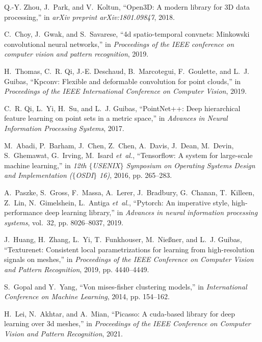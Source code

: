 \begin{thebibliography}{1}
Q.-Y. Zhou, J.~Park, and V.~Koltun, ``{Open3D: A modern library for 3D data
  processing},'' in \emph{arXiv preprint arXiv:1801.09847}, 2018.

C.~Choy, J.~Gwak, and S.~Savarese, ``4d spatio-temporal convnets: Minkowski
  convolutional neural networks,'' in \emph{Proceedings of the IEEE conference on
  computer vision and pattern recognition}, 2019.

H.~Thomas, C.~R. Qi, J.-E. Deschaud, B.~Marcotegui, F.~Goulette, and L.~J.
  Guibas, ``Kpconv: Flexible and deformable convolution for point clouds,'' in 
  \emph{Proceedings of the IEEE International Conference on Computer Vision},
  2019.

C.~R. Qi, L.~Yi, H.~Su, and L.~J. Guibas, ``{PointNet++}: Deep hierarchical
  feature learning on point sets in a metric space,'' in \emph{Advances in Neural
  Information Processing Systems}, 2017.

M.~Abadi, P.~Barham, J.~Chen, Z.~Chen, A.~Davis, J.~Dean, M.~Devin,
  S.~Ghemawat, G.~Irving, M.~Isard \emph{et~al.}, ``Tensorflow: A system for
  large-scale machine learning,'' in \emph{12th $\{$USENIX$\}$ Symposium on
  Operating Systems Design and Implementation ($\{$OSDI$\}$ 16)}, 2016, pp.
  265--283.

A.~Paszke, S.~Gross, F.~Massa, A.~Lerer, J.~Bradbury, G.~Chanan, T.~Killeen,
  Z.~Lin, N.~Gimelshein, L.~Antiga \emph{et~al.}, ``Pytorch: An imperative
  style, high-performance deep learning library,'' in \emph{Advances in neural
  information processing systems}, vol.~32, pp. 8026--8037, 2019.

J.~Huang, H.~Zhang, L.~Yi, T.~Funkhouser, M.~Nie{\ss}ner, and L.~J. Guibas,
  ``Texturenet: Consistent local parametrizations for learning from
  high-resolution signals on meshes,'' in \emph{Proceedings of the IEEE
  Conference on Computer Vision and Pattern Recognition}, 2019, pp. 4440--4449.

S.~Gopal and Y.~Yang, ``Von mises-fisher clustering models,'' in
  \emph{International Conference on Machine Learning}, 2014, pp. 154--162.

H.~Lei, N.~Akhtar, and A.~Mian, ``Picasso: A cuda-based library for deep
  learning over 3d meshes,'' in \emph{Proceedings of the IEEE Conference on
  Computer Vision and Pattern Recognition}, 2021.


\end{thebibliography}
